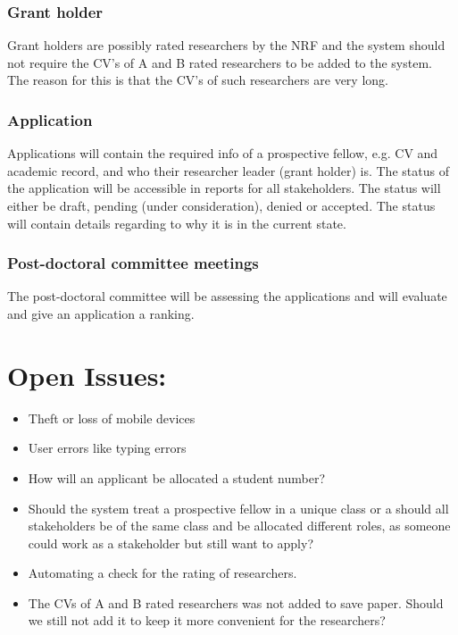 \documentclass[12pt]{article}
\begin{document}
\subsubsection{Grant holder}
Grant holders are possibly rated researchers by the NRF and the system should not require the CV's of A and B rated researchers to be added to the system. The reason for this is that the CV's of such researchers are very long.

\subsubsection{Application}
Applications will contain the required info of a prospective fellow, e.g. CV and academic record, and who their researcher leader (grant holder) is. The status of the application will be accessible in reports for all stakeholders. The status will either be draft, pending (under consideration), denied or accepted. The status will contain details regarding to why it is in the current state.

\subsubsection{Post-doctoral committee meetings}
The post-doctoral committee will be assessing the applications and will evaluate and give an application a ranking.

\newpage	
\section{Open Issues:} %
\vspace{0.2in}

\begin{itemize}
\item Theft or loss of mobile devices
\item User errors like typing errors
\item How will an applicant be allocated a student number?
\item Should the system treat a prospective fellow in a unique class or a should all stakeholders be of the same class and be allocated different roles, as someone could work as a stakeholder but still want to apply?
\item Automating a check for the rating of researchers.
\item The CVs of A and B rated researchers was not added to save paper. Should we still not add it to keep it more convenient for the researchers?
\end{itemize}
\end{document}

